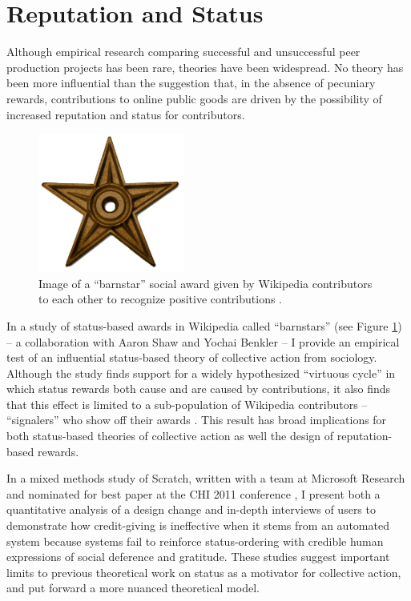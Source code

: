 \documentclass[10pt]{memoir}
\begin{document}
\section{Reputation and Status}

Although empirical research comparing successful and unsuccessful peer
production projects has been rare, theories have been widespread. No
theory has been more influential than the suggestion that, in the
absence of pecuniary rewards, contributions to online public goods are
driven by the possibility of increased reputation and status for
contributors.

\begin{figure}
 \vspace{-1em}
 \begin{centering}
 \includegraphics[width=1.9in]{figures/barnstar_alone.png}
 \caption{Image of a ``barnstar'' social award given by Wikipedia
   contributors to each other to recognize positive contributions .}
 \label{fig:barnstar}
 \end{centering}
 \vspace{-1em}
\end{figure}

In a study of status-based awards in Wikipedia called ``barnstars''
(see Figure \ref{fig:barnstar}) -- a collaboration with Aaron Shaw and
Yochai Benkler -- I provide an empirical test of an influential
status-based theory of collective action from sociology. Although the
study finds support for a widely hypothesized ``virtuous cycle'' in which
status rewards both cause and are caused by contributions, it also
finds that this effect is limited to a sub-population of Wikipedia
contributors -- ``signalers'' who show off their awards
\cite{hill_status_2012}. This result has broad implications for both
status-based theories of collective action as well the design of
reputation-based rewards.

In a mixed methods study of Scratch, written with a team at Microsoft
Research and nominated for best paper at the CHI 2011 conference
\cite{monroy-hernandez_computers_2011}, I present both a quantitative
analysis of a design change and in-depth interviews of users to
demonstrate how credit-giving is ineffective when it stems from an
automated system because systems fail to reinforce status-ordering
with credible human expressions of social deference and
gratitude. These studies suggest important limits to previous
theoretical work on status as a motivator for collective action, and
put forward a more nuanced theoretical model.
\end{document}
